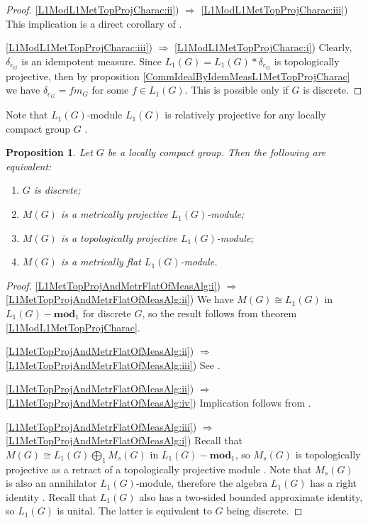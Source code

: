 \documentclass{article}
\theoremstyle{plain}
\newtheorem{proposition}{Proposition}[section]
\theoremstyle{definition}
\newtheorem{proof}{Proof}\def\theproof{}
\newcommand{\convol}{\ast}
\newcommand{\isom}{\mathop{\mathbin{\cong}}}
\begin{document}
\begin{fulltext}
\begin{proof}
\ref{L1ModL1MetTopProjCharac:ii}) $\Longrightarrow$ \ref{L1ModL1MetTopProjCharac:iii}) 
This implication is a direct corollary of \cite[proposition 2.4]{NemGeomProjInjFlatBanMod}.

\ref{L1ModL1MetTopProjCharac:iii}) $\Longrightarrow$ \ref{L1ModL1MetTopProjCharac:i}) 
Clearly, $\delta_{e_G}$ is an idempotent measure. Since 
$L_1(G)=L_1(G)\convol \delta_{e_G}$ is topologically projective, then by proposition 
\ref{CommIdealByIdemMeasL1MetTopProjCharac} we have $\delta_{e_G}=f m_G$ for some 
$f\in L_1(G)$. This is possible only if $G$ is discrete.
\end{proof}

Note that $L_1(G)$-module $L_1(G)$ is relatively projective for any locally compact 
group $G$ \cite[exercise 7.1.17]{HelBanLocConvAlg}.

\begin{proposition}\label{L1MetTopProjAndMetrFlatOfMeasAlg} Let $G$ be a locally compact 
group. Then the following are equivalent:
\begin{enumerate}
    \item $G$ is discrete;
    \label{L1MetTopProjAndMetrFlatOfMeasAlg:i}
    \item $M(G)$ is a metrically projective $L_1(G)$-module;
    \label{L1MetTopProjAndMetrFlatOfMeasAlg:ii}
    \item $M(G)$ is a topologically projective $L_1(G)$-module;
    \label{L1MetTopProjAndMetrFlatOfMeasAlg:iii}
    \item $M(G)$ is a metrically flat $L_1(G)$-module.
    \label{L1MetTopProjAndMetrFlatOfMeasAlg:iv}
\end{enumerate}
\end{proposition}
\begin{proof} 
\ref{L1MetTopProjAndMetrFlatOfMeasAlg:i}) $\Longrightarrow$ \ref{L1MetTopProjAndMetrFlatOfMeasAlg:ii})
We have $M(G)\isom L_1(G)$ in $L_1(G)-\mathbf{mod}_1$ for 
discrete $G$, so the result follows from theorem \ref{L1ModL1MetTopProjCharac}. 

\ref{L1MetTopProjAndMetrFlatOfMeasAlg:ii}) $\Longrightarrow$ \ref{L1MetTopProjAndMetrFlatOfMeasAlg:iii})
See \cite[proposition 2.4]{NemGeomProjInjFlatBanMod}.

\ref{L1MetTopProjAndMetrFlatOfMeasAlg:ii}) $\Longrightarrow$ \ref{L1MetTopProjAndMetrFlatOfMeasAlg:iv})
Implication follows from \cite[proposition 2.26]{NemGeomProjInjFlatBanMod}.

\ref{L1MetTopProjAndMetrFlatOfMeasAlg:iii}) $\Longrightarrow$ \ref{L1MetTopProjAndMetrFlatOfMeasAlg:i})
Recall that $M(G)\isom L_1(G)\bigoplus_1 M_s(G)$ in 
$L_1(G)-\mathbf{mod}_1$, so $M_s(G)$ is topologically projective as a retract of a 
topologically projective module \cite[proposition 2.2]{NemGeomProjInjFlatBanMod}. 
Note that $M_s(G)$ is also an annihilator $L_1(G)$-module, therefore the algebra 
$L_1(G)$ has a right identity \cite[proposition 3.3]{NemGeomProjInjFlatBanMod}. 
Recall that $L_1(G)$ also has a two-sided bounded approximate identity, so $L_1(G)$ 
is unital. The latter is equivalent to $G$ being discrete.


\end{proof}
\end{fulltext}
\end{document}
